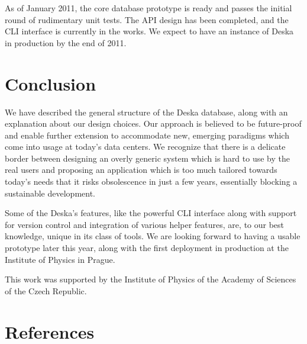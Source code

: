 \documentclass[a4paper]{jpconf}
\begin{document}
As of January 2011, the core database prototype is ready and passes the initial round of rudimentary unit tests.  The API design has
been completed, and the CLI interface is currently in the works. We expect to have an instance of Deska in production by the end of
2011.

\section{Conclusion}

We have described the general structure of the Deska database, along with an explanation about our design choices.  Our approach is
believed to be future-proof and enable further extension to accommodate new, emerging paradigms which come into usage at today's data
centers.  We recognize that there is a delicate border between designing an overly generic system which is hard to use by the real
users and proposing an application which is too much tailored towards today's needs that it risks obsolescence in just a few years,
essentially blocking a sustainable development.

Some of the Deska's features, like the powerful CLI interface along with support for version control and integration of various helper
features, are, to our best knowledge, unique in its class of tools.  We are looking forward to having a usable prototype later this
year, along with the first deployment in production at the Institute of Physics in Prague.

\ack
This work was supported by the Institute of Physics of the Academy of Sciences of the Czech Republic.

\section*{References}


\end{document}
